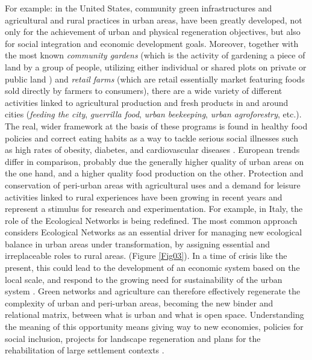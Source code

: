 \documentclass[10pt,a4paper]{article}
\begin{document}
\begin{multicols}{2}
For example: in the United States, community green infrastructures and agricultural and rural practices in urban areas, have been greatly developed, not only for the achievement of urban and physical regeneration objectives, but also for social integration and economic development goals. Moreover, together with the most known \textit{community gardens} (which is the activity of gardening a piece of land by a group of people, utilizing either individual or shared plots on private or public land \citep{r32, r33, r34}) and \textit{retail farms} (which are retail essentially market featuring foods sold directly by farmers to consumers), there are a wide variety of different activities linked to agricultural production and fresh products in and around cities (\textit{feeding the city}, \textit{guerrilla food}, \textit{urban beekeeping}, \textit{urban agroforestry}, etc.). The real, wider framework at the basis of these programs is found in healthy food policies and correct eating habits as a way to tackle serious social illnesses such as high rates of obesity, diabetes, and cardiovascular diseases \citep{r35, r36, r37, r38, r06}. European trends differ in comparison, probably due the generally higher quality of urban areas on the one hand, and a higher quality food production on the other. Protection and conservation of peri-urban areas with agricultural uses and a demand for leisure activities linked to rural experiences have been growing in recent years and represent a stimulus for research and experimentation. For example, in Italy, the role of the Ecological Networks is being redefined. The most common approach considers Ecological Networks as an essential driver for managing new ecological balance in urban areas under transformation, by assigning essential and irreplaceable roles to rural areas. (Figure \ref{Fig03}). In a time of crisis like the present, this could lead to the development of an economic system based on the local scale, and respond to the growing need for sustainability of the urban system \citep{r39, r40}. Green networks and agriculture can therefore effectively regenerate the complexity of urban and peri-urban areas, becoming the new binder and relational matrix, between what is urban and what is open space. Understanding the meaning of this opportunity means giving way to new economies, policies for social inclusion, projects for landscape regeneration and plans for the rehabilitation of large settlement contexts \citep{r06}.

\vspace{\baselineskip}

\end{multicols}
\end{document}

